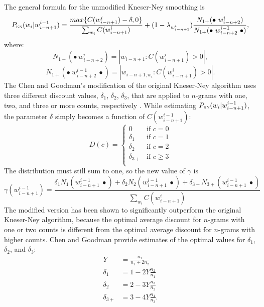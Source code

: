 	The general formula for the unmodified Kneser-Ney smoothing is
	\begin{equation}
		P_{\textsc{kn}}(w_{i}|w_{i-n+1}^{i-1})= \frac{max\{C(w_{i-n+1}^{i})-\delta, 0\}}{\sum_{w_{i}}C(w_{i-n+1}^{i})}+(1-\lambda_{w_{i-n+1}^{i}})\frac{N_{1+}(\bullet~w_{i-n+2}^{i})}{N_{1+}(\bullet~w_{i-n+2}^{i-1}~\bullet)},
	\end{equation}
	where:
	\begin{equation}
		N_{1+}(\bullet~w_{i-n+2}^{i})=|{w_{i-n+1}:C(w_{i-n+1}^{i})>0}|,
	\end{equation}
	\begin{equation}
		N_{1+}(\bullet~w_{i-n+2}^{i-1}~\bullet)=|{w_{i-n+1, w_{i}}:C(w_{i-n+1}^{i})>0}|.
	\end{equation}
	The Chen and Goodman's modification of the original Kneser-Ney algorithm uses three different discount values, $\delta_{1}$, $\delta_{2}$, $\delta_{3}$, that are applied to \mbox{$n$-gram}s with one, two, and three or more counts, respectively \cite{chen1996empirical}. While estimating $P_{\textsc{kn}}(w_{i}|w_{i-n+1}^{i-1})$, the parameter $\delta$ simply becomes a function of $C(w_{i-n+1}^{i-1})$: 
	\begin{equation}
		D(c)=	
		\begin{cases}
			0 & \text{if } c=0\\
			\delta_{1} & \text{if } c=1\\
			\delta_{2} & \text{if } c=2\\
			\delta_{3+} & \text{if } c\geq3\\
		\end{cases}
	\end{equation}
	The distribution must still sum to one, so the new value of $\gamma$ is
	\begin{equation}
		\gamma(w_{i-n+1}^{i-1})=\frac{\delta_{1}N_{1}(w_{i-n+1}^{i-1}~\bullet)+\delta_{2}N_{2}(w_{i-n+1}^{i-1}~\bullet)+\delta_{3+}N_{3+}(w_{i-n+1}^{i-1}~\bullet)}{\sum_{w_{i}}C(w_{i-n+1}^{i})}
	\end{equation}
	The modified version has been shown to significantly outperform the original Kneser-Ney algorithm, because the optimal average discount for \mbox{$n$-gram}s with one or two counts is different from the optimal average discount for \mbox{$n$-gram}s with higher counts. Chen and Goodman provide estimates of the optimal values for $\delta_{1}$, $\delta_{2}$, and $\delta_{3}$:
	\begin{align}
		Y&=\frac{n_{1}}{n_{1}+2n_{2}} \nonumber\\ 
		\delta_{1}&=1-2Y\frac{n_{2}}{n_{1}} \nonumber\\
		\delta_{2}&=2-3Y\frac{n_{3}}{n_{2}} \nonumber\\
		\delta_{3+}&=3-4Y\frac{n_{4}}{n_{3}}.
	\end{align}
